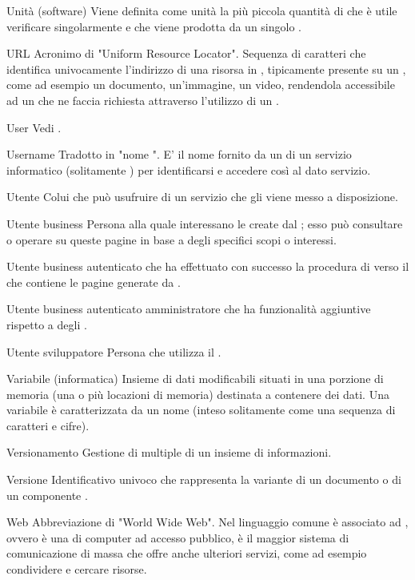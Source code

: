 \elemento
{Unità (software)}
{Viene definita come unità la più piccola quantità di  che è utile verificare singolarmente e che viene prodotta da un singolo .}

\elemento
{URL}
{Acronimo di "Uniform Resource Locator". Sequenza di caratteri che identifica univocamente l'indirizzo di una risorsa in , tipicamente presente su un  , come ad esempio un documento, un'immagine, un video, rendendola accessibile ad un  che ne faccia richiesta attraverso l'utilizzo di un  .}

\elemento
{User}
{Vedi .}

\elemento
{Username}
{Tradotto in "nome ". E' il nome fornito da un  di un servizio informatico (solitamente ) per identificarsi e accedere così al dato servizio.}

\elemento
{Utente}
{Colui che può usufruire di un servizio che gli viene messo a disposizione.}

\elemento
{Utente business}
{Persona alla quale interessano le  create dal  ; esso può consultare o operare su queste pagine in base a degli specifici scopi o interessi.}

\elemento
{Utente business autenticato}
{ che ha effettuato con successo la procedura di  verso il  che contiene le pagine generate da .}

\elemento
{Utente business autenticato amministratore}
{ che ha funzionalità aggiuntive rispetto a degli .}

\gloss
{Utente sviluppatore}
{Persona che utilizza il  .}


\elemento
{Variabile (informatica)}
{Insieme di dati modificabili situati in una porzione di memoria (una o più locazioni di memoria) destinata a contenere dei dati. Una variabile è caratterizzata da un nome (inteso solitamente come una sequenza di caratteri e cifre).}

\elemento
{Versionamento}
{Gestione di  multiple di un insieme di informazioni.}

\elemento
{Versione}
{Identificativo univoco che rappresenta la variante di un documento o di un componente .}



\elemento
{Web}
{Abbreviazione di "World Wide Web". Nel linguaggio comune è associato ad , ovvero è una   di computer ad accesso pubblico, è il maggior sistema di comunicazione di massa che offre anche ulteriori servizi, come ad esempio condividere e cercare risorse.}

